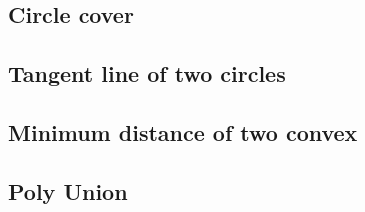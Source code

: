\documentclass[a4paper,10pt,twocolumn,oneside]{article}
\begin{document}
\subsection{Circle cover}


%

\subsection{Tangent line of two circles}



\subsection{Minimum distance of two convex}


%
%

\subsection{Poly Union}


%

% 

%
\end{document}
